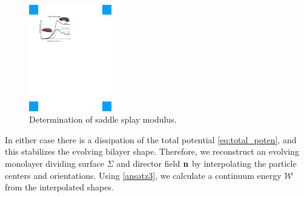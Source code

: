 \begin{figure}
\centerline{\includegraphics[width=0.32\textwidth]{Figures/SaddleSplayDiagram.pdf}}
  \vspace{-8pt}
\caption{\label{fig:saddle_splay} \footnotesize Determination of
  saddle splay modulus.}
\end{figure}
%
In either case there is a dissipation of the total potential \eqref{eq:total_poten}, and this stabilizes the evolving bilayer shape.
Therefore, we reconstruct an evolving monolayer dividing surface $\Sigma$ and director field ${\bf n}$ by
interpolating the particle centers and orientations. Using \eqref{ansatz3}, we calculate a continuum energy $\mathcal{W}$ from the interpolated shapes.


%
%

